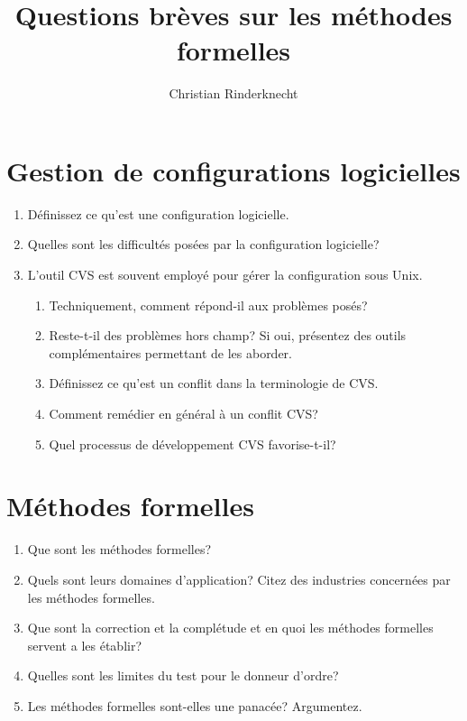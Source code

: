 \documentclass[10pt,a4paper]{article}
\title{Questions brèves sur les méthodes formelles}
\author{Christian Rinderknecht}
\begin{document}
\maketitle

\section{Gestion de configurations logicielles}

\begin{enumerate}

  \item Définissez ce qu'est une configuration logicielle.

  \item Quelles sont les difficultés posées par la configuration logicielle?

  \item L'outil CVS est souvent employé pour gérer la configuration sous Unix.

   \begin{enumerate}

     \item Techniquement, comment répond-il aux problèmes posés?

     \item Reste-t-il des problèmes hors champ? Si oui, présentez des
     outils complémentaires permettant de les aborder.

     \item Définissez ce qu'est un conflit dans la terminologie de CVS.

     \item Comment remédier en général à un conflit CVS?

     \item Quel processus de développement CVS favorise-t-il?

   \end{enumerate}

\end{enumerate}


\section{Méthodes formelles}

\begin{enumerate}

  \item Que sont les méthodes formelles?

  \item Quels sont leurs domaines d'application? Citez des industries
  concernées par les méthodes formelles.

  \item Que sont la correction et la complétude et en quoi les
  méthodes formelles servent a les établir?

  \item Quelles sont les limites du test pour le donneur d'ordre?

  \item Les méthodes formelles sont-elles une panacée? Argumentez.

\end{enumerate}
\end{document}
